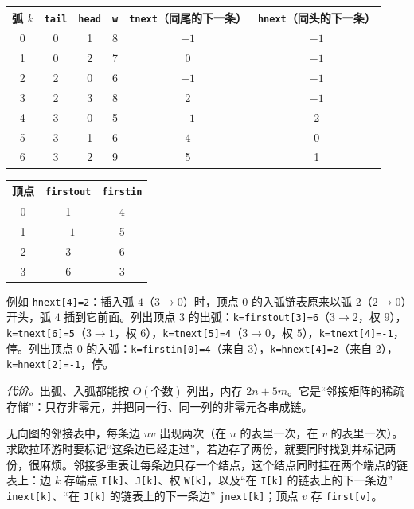 \begin{center}
\begin{tabular}{cccccc}
\toprule
弧 $k$ & \texttt{tail} & \texttt{head} & \texttt{w} & \texttt{tnext}（同尾的下一条） & \texttt{hnext}（同头的下一条） \\
\midrule
0 & 0 & 1 & 8 & $-1$ & $-1$ \\
1 & 0 & 2 & 7 & 0 & $-1$ \\
2 & 2 & 0 & 6 & $-1$ & $-1$ \\
3 & 2 & 3 & 8 & 2 & $-1$ \\
4 & 3 & 0 & 5 & $-1$ & 2 \\
5 & 3 & 1 & 6 & 4 & 0 \\
6 & 3 & 2 & 9 & 5 & 1 \\
\bottomrule
\end{tabular}
\qquad
\begin{tabular}{ccc}
\toprule
顶点 & \texttt{firstout} & \texttt{firstin} \\
\midrule
0 & 1 & 4 \\
1 & $-1$ & 5 \\
2 & 3 & 6 \\
3 & 6 & 3 \\
\bottomrule
\end{tabular}
\end{center}

例如 \texttt{hnext[4]=2}：插入弧 $4$（$3\to0$）时，顶点 $0$ 的入弧链表原来以弧 $2$（$2\to0$）开头，弧 $4$ 插到它前面。列出顶点 $3$ 的出弧：\texttt{k=firstout[3]=6}（$3\to2$，权 $9$），\texttt{k=tnext[6]=5}（$3\to1$，权 $6$），\texttt{k=tnext[5]=4}（$3\to0$，权 $5$），\texttt{k=tnext[4]=-1}，停。列出顶点 $0$ 的入弧：\texttt{k=firstin[0]=4}（来自 $3$），\texttt{k=hnext[4]=2}（来自 $2$），\texttt{k=hnext[2]=-1}，停。

\emph{代价。}出弧、入弧都能按 $O(\text{个数})$ 列出，内存 $2n+5m$。它是“邻接矩阵的稀疏存储”：只存非零元，并把同一行、同一列的非零元各串成链。


无向图的邻接表中，每条边 $uv$ 出现两次（在 $u$ 的表里一次，在 $v$ 的表里一次）。求欧拉环游时要标记“这条边已经走过”，若边存了两份，就要同时找到并标记两份，很麻烦。邻接多重表让每条边只存一个结点，这个结点同时挂在两个端点的链表上：边 $k$ 存端点 \texttt{I[k]}、\texttt{J[k]}、权 \texttt{W[k]}，以及“在 \texttt{I[k]} 的链表上的下一条边” \texttt{inext[k]}、“在 \texttt{J[k]} 的链表上的下一条边” \texttt{jnext[k]}；顶点 $v$ 存 \texttt{first[v]}。

